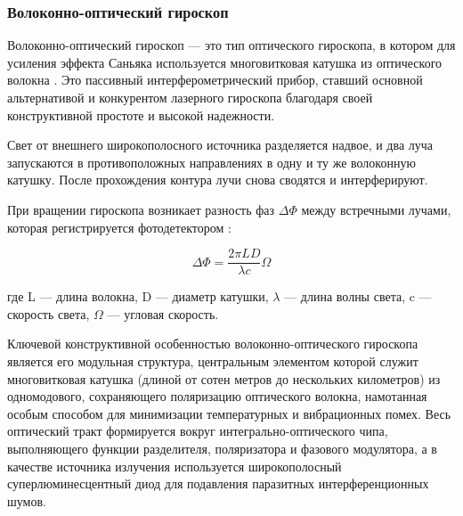 
\subsubsection{Волоконно-оптический гироскоп}

Волоконно-оптический гироскоп — это тип оптического гироскопа, в котором для усиления эффекта Саньяка используется многовитковая катушка из оптического волокна \cite{volokonno_opticheskiy_1987}. Это пассивный интерферометрический прибор, ставший основной альтернативой и конкурентом лазерного гироскопа благодаря своей конструктивной простоте и высокой надежности.

Свет от внешнего широкополосного источника разделяется надвое, и два луча запускаются в противоположных направлениях в одну и ту же волоконную катушку. После прохождения контура лучи снова сводятся и интерферируют.

При вращении гироскопа возникает разность фаз $\Delta \Phi$ между встречными лучами, которая регистрируется фотодетектором \cite{volokonno_opticheskiy_1987}:

\begin{equation}
	\Delta \Phi = \frac{2 \pi L D}{\lambda c} \Omega
\end{equation}

где L — длина волокна, D — диаметр катушки, $\lambda$ — длина волны света, c — скорость света, $\Omega$ — угловая скорость.

Ключевой конструктивной особенностью волоконно-оптического гироскопа является его модульная структура, центральным элементом которой служит многовитковая катушка (длиной от сотен метров до нескольких километров) из одномодового, сохраняющего поляризацию оптического волокна, намотанная особым способом для минимизации температурных и вибрационных помех. Весь оптический тракт формируется вокруг интегрально-оптического чипа, выполняющего функции разделителя, поляризатора и фазового модулятора, а в качестве источника излучения используется широкополосный суперлюминесцентный диод для подавления паразитных интерференционных шумов.

